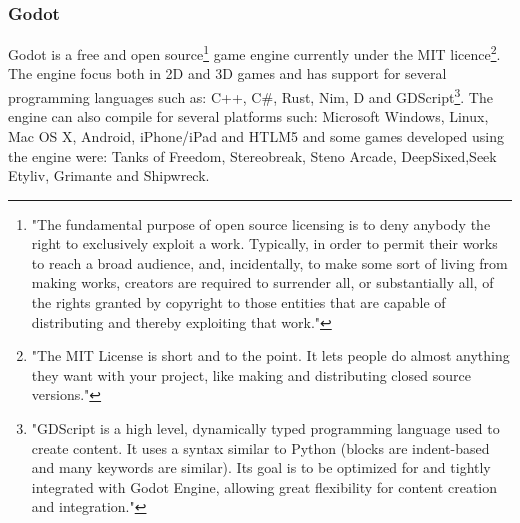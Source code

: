 \subsubsection{Godot}
Godot is a free and open source\footnote{"The fundamental purpose of open source licensing is to deny anybody the right to exclusively exploit a work. Typically, in order to permit their works to reach a broad audience, and, incidentally, to make some sort of living from making works, creators are required to surrender all, or substantially all, of the rights granted by copyright to those entities that are capable of distributing and thereby exploiting that work."\cite{OpenSource}} game engine currently under the MIT licence\footnote{"The MIT License is short and to the point. It lets people do almost anything they want with your project, like making and distributing closed source versions."\cite{MIT}}. The engine focus both in 2D and 3D games and has support for several programming languages such as: C++, C\#, Rust, Nim, D and GDScript\footnote{"GDScript is a high level, dynamically typed programming language used to create content. It uses a syntax similar to Python (blocks are indent-based and many keywords are similar). Its goal is to be optimized for and tightly integrated with Godot Engine, allowing great flexibility for content creation and integration."\cite{GDScript}}. The engine can also compile for several platforms such: Microsoft Windows, Linux, Mac OS X, Android, iPhone/iPad and HTLM5\cite{GodotAbout} and some games developed using the engine were: Tanks of Freedom, Stereobreak, Steno Arcade, DeepSixed,Seek Etyliv, Grimante and Shipwreck\cite{GodotGames}.